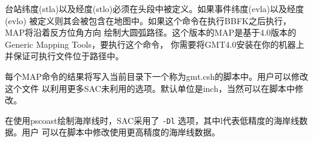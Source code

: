 台站纬度(stla)以及经度(stlo)必须在头段中被定义。如果事件纬度(evla)以及经度(evlo)
被定义则其会被包含在地图中。如果这个命令在执行BBFK之后执行，MAP将沿着反方位角方向
绘制大圆弧路径。这个版本的MAP是基于4.0版本的Generic Mapping Tools，要执行这个命令，
你需要将GMT4.0安装在你的机器上并保证可执行文件位于路径中。

每个MAP命令的结果将写入当前目录下一个称为gmt.csh的脚本中。用户可以修改这个文件
以利用更多SAC未利用的选项。默认单位是inch，当然可以在脚本中修改。

在使用pscoast绘制海岸线时，SAC采用了 \texttt{-Dl} 选项，其中l代表低精度的海岸线数据。用户
可以在脚本中修改使用更高精度的海岸线数据。